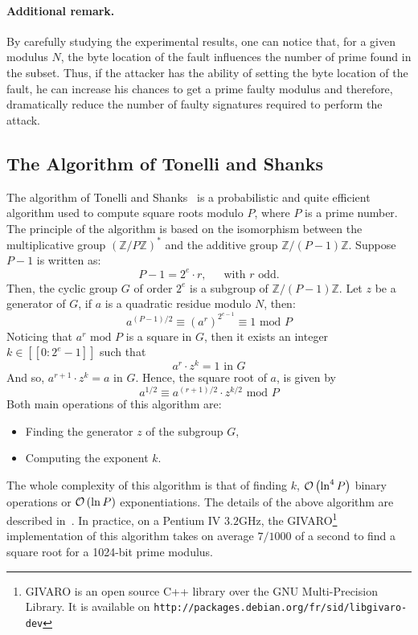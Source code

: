 \documentclass{article}
\begin{document}
\paragraph{Additional remark.}
By carefully studying the experimental results, one can notice that,
for a given modulus $N$, the byte location of the fault influences the
number of prime found in the subset. Thus, if the attacker has the
ability of setting the byte location of the fault, he can increase his
chances to get a prime faulty modulus and therefore, dramatically reduce the number of faulty signatures required to perform the attack.

\subsection{The Algorithm of Tonelli and Shanks}
\label{sec:ts}
The algorithm of Tonelli and Shanks~\cite{79} is a probabilistic and quite efficient algorithm used to compute square roots modulo $P$, where $P$ is a prime number.
The principle of the algorithm is based on the isomorphism between the multiplicative group $\left( \mathbb{Z}/P\mathbb{Z}\right)^{\ast}$ and the additive group $\mathbb{Z}/\left( P-1 \right)\mathbb{Z}$. Suppose $P-1$ is written as:
\begin{equation}
  P-1 = 2^{e} \cdot r \mbox{,~~~~~with }r \mbox{ odd}.
\end{equation}
Then, the cyclic group $G$ of order $2^{e}$ is a subgroup of $\mathbb{Z}/\left( P-1 \right)\mathbb{Z}$.
Let $z$ be a generator of $G$, if $a$ is a quadratic residue modulo $N$, then:
\begin{equation} 
 a^{\left( P-1\right)/2} \equiv \left(a^{r}\right)^{2^{e-1}} \equiv 1 \mbox{ mod } P 
\end{equation}
Noticing that $a^{r}\mbox{ mod } P$ is a square in $G$, then it exists an integer $k \in [\![0:2^{e}-1]\!]$ such that
\begin{equation}
 a^{r} \cdot z^{k} = 1 \mbox{ in } G
\end{equation}
And so, $a^{r+1} \cdot z^{k} = a \mbox{ in } G$. Hence, the square root of $a$, is given by
\begin{equation}
 a^{1/2} \equiv a^{\left( r+1\right)/2} \cdot z^{k/2} \mbox{ mod } P
\end{equation}
Both main operations of this algorithm are:
\begin{itemize}
 \item Finding the generator $z$ of the subgroup $G$,
 \item Computing the exponent $k$.
\end{itemize}
The whole complexity of this algorithm is that of finding $k$, ${\cal
  O} \left( \ln^{4} P\right)$ binary operations or ${\cal O} \left(
  \ln P\right)$ exponentiations. The details of the above algorithm
are described in~\cite{79}. In practice, on a Pentium IV $3.2$GHz, the
GIVARO\footnote[2]{GIVARO is an open source C++ library over the GNU
  Multi-Precision Library. It is available on
  \texttt{http://packages.debian.org/fr/sid/libgivaro-dev}}
implementation of this algorithm takes on average $7/1000$ of a second
to find a square root for a 1024-bit prime modulus. 
\end{document}
